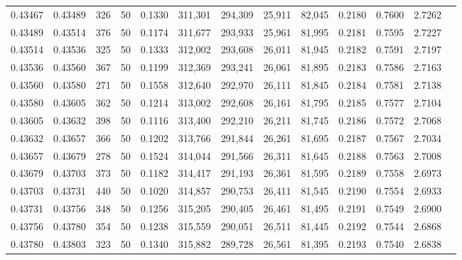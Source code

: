 \begin{tabular}{rrrrrrrrrrrrr}
0.43467 & 0.43489 &   326 &  50 &                                     0.1330 & 311,301 & 294,309 &  25,911 &  82,045 & 0.2180 & 0.7600 & 2.7262 \\
0.43489 & 0.43514 &   376 &  50 &                                     0.1174 & 311,677 & 293,933 &  25,961 &  81,995 & 0.2181 & 0.7595 & 2.7227 \\
0.43514 & 0.43536 &   325 &  50 &                                     0.1333 & 312,002 & 293,608 &  26,011 &  81,945 & 0.2182 & 0.7591 & 2.7197 \\
0.43536 & 0.43560 &   367 &  50 &                                     0.1199 & 312,369 & 293,241 &  26,061 &  81,895 & 0.2183 & 0.7586 & 2.7163 \\
0.43560 & 0.43580 &   271 &  50 &                                     0.1558 & 312,640 & 292,970 &  26,111 &  81,845 & 0.2184 & 0.7581 & 2.7138 \\
0.43580 & 0.43605 &   362 &  50 &                                     0.1214 & 313,002 & 292,608 &  26,161 &  81,795 & 0.2185 & 0.7577 & 2.7104 \\
0.43605 & 0.43632 &   398 &  50 &                                     0.1116 & 313,400 & 292,210 &  26,211 &  81,745 & 0.2186 & 0.7572 & 2.7068 \\
0.43632 & 0.43657 &   366 &  50 &                                     0.1202 & 313,766 & 291,844 &  26,261 &  81,695 & 0.2187 & 0.7567 & 2.7034 \\
0.43657 & 0.43679 &   278 &  50 &                                     0.1524 & 314,044 & 291,566 &  26,311 &  81,645 & 0.2188 & 0.7563 & 2.7008 \\
0.43679 & 0.43703 &   373 &  50 &                                     0.1182 & 314,417 & 291,193 &  26,361 &  81,595 & 0.2189 & 0.7558 & 2.6973 \\
0.43703 & 0.43731 &   440 &  50 &                                     0.1020 & 314,857 & 290,753 &  26,411 &  81,545 & 0.2190 & 0.7554 & 2.6933 \\
0.43731 & 0.43756 &   348 &  50 &                                     0.1256 & 315,205 & 290,405 &  26,461 &  81,495 & 0.2191 & 0.7549 & 2.6900 \\
0.43756 & 0.43780 &   354 &  50 &                                     0.1238 & 315,559 & 290,051 &  26,511 &  81,445 & 0.2192 & 0.7544 & 2.6868 \\
0.43780 & 0.43803 &   323 &  50 &                                     0.1340 & 315,882 & 289,728 &  26,561 &  81,395 & 0.2193 & 0.7540 & 2.6838 \\

\end{tabular}
